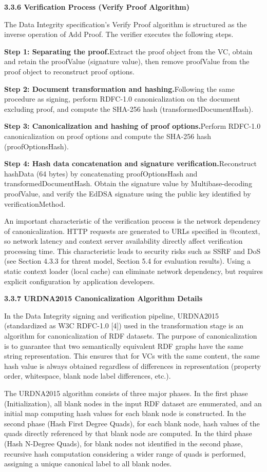 \textbf{3.3.6 Verification Process (Verify Proof Algorithm)}

The Data Integrity specification's Verify Proof algorithm is structured as the inverse operation of Add Proof. The verifier executes the following steps.

\textbf{Step 1: Separating the proof.}Extract the proof object from the VC, obtain and retain the proofValue (signature value), then remove proofValue from the proof object to reconstruct proof options.

\textbf{Step 2: Document transformation and hashing.}Following the same procedure as signing, perform RDFC-1.0 canonicalization on the document excluding proof, and compute the SHA-256 hash (transformedDocumentHash).

\textbf{Step 3: Canonicalization and hashing of proof options.}Perform RDFC-1.0 canonicalization on proof options and compute the SHA-256 hash (proofOptionsHash).

\textbf{Step 4: Hash data concatenation and signature verification.}Reconstruct hashData (64 bytes) by concatenating proofOptionsHash and transformedDocumentHash. Obtain the signature value by Multibase-decoding proofValue, and verify the EdDSA signature using the public key identified by verificationMethod.

An important characteristic of the verification process is the network dependency of canonicalization. HTTP requests are generated to URLs specified in @context, so network latency and context server availability directly affect verification processing time. This characteristic leads to security risks such as SSRF and DoS (see Section 4.3.3 for threat model, Section 5.4 for evaluation results). Using a static context loader (local cache) can eliminate network dependency, but requires explicit configuration by application developers.

\textbf{3.3.7 URDNA2015 Canonicalization Algorithm Details}

In the Data Integrity signing and verification pipeline, URDNA2015 (standardized as W3C RDFC-1.0 {[}4{]}) used in the transformation stage is an algorithm for canonicalization of RDF datasets. The purpose of canonicalization is to guarantee that two semantically equivalent RDF graphs have the same string representation. This ensures that for VCs with the same content, the same hash value is always obtained regardless of differences in representation (property order, whitespace, blank node label differences, etc.).

The URDNA2015 algorithm consists of three major phases. In the first phase (Initialization), all blank nodes in the input RDF dataset are enumerated, and an initial map computing hash values for each blank node is constructed. In the second phase (Hash First Degree Quads), for each blank node, hash values of the quads directly referenced by that blank node are computed. In the third phase (Hash N-Degree Quads), for blank nodes not identified in the second phase, recursive hash computation considering a wider range of quads is performed, assigning a unique canonical label to all blank nodes.


